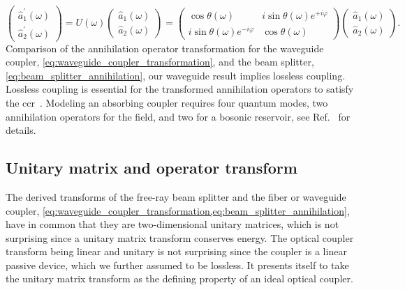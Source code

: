 \begin{equation}
	\begin{pmatrix}
        \hat{a}_1^\prime(\omega) \\
        \hat{a}_2^\prime(\omega)
    \end{pmatrix}
    =
    U(\omega)
    \begin{pmatrix}
        \hat{a}_1(\omega) \\
        \hat{a}_2(\omega)
    \end{pmatrix}
    =
    \begin{pmatrix}
        \cos\theta(\omega) & i\sin\theta(\omega)e^{+i\varphi} 
        \\
        i\sin\theta(\omega)e^{-i\varphi} & \cos\theta(\omega)
    \end{pmatrix}
    \begin{pmatrix}
        \hat{a}_1(\omega) \\
        \hat{a}_2(\omega)
    \end{pmatrix}
    \label{eq:waveguide_coupler_transformation}
    .
\end{equation}
Comparison of the annihilation operator transformation for the waveguide coupler, \cref{eq:waveguide_coupler_transformation}, and the beam splitter, \cref{eq:beam_splitter_annihilation}, our waveguide result implies lossless coupling.
Lossless coupling is essential for the transformed annihilation operators to satisfy the \gls{ccr}~\cite[p.~38]{Gerry2005}.
Modeling an absorbing coupler requires four quantum modes, two annihilation operators for the field, and two for a bosonic reservoir, see Ref.~\cite[p.~210]{Vogel2006} for details.

\subsection{Unitary matrix and operator transform}

The derived transforms of the free-ray beam splitter and the fiber or waveguide coupler, \cref{eq:waveguide_coupler_transformation,eq:beam_splitter_annihilation}, have in common that they are two-dimensional unitary matrices, which is not surprising since a unitary matrix transform conserves energy.
The optical coupler transform being linear and unitary is not surprising since the coupler is a linear passive device, which we further assumed to be lossless.
It presents itself to take the unitary matrix transform as the defining property of an ideal optical coupler.

